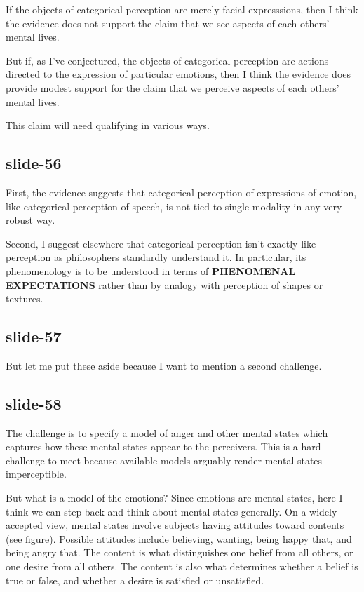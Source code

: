 \documentclass[12pt,\papersize]{extarticle}
\begin{document}
If the objects of categorical perception are merely facial expresssions,
then I think the evidence does not support the claim that we see aspects of
each others’ mental lives.

But if, as I’ve conjectured, the objects of categorical perception are
actions directed to the expression of particular emotions, then I think the
evidence does provide modest support for the claim that we perceive aspects
of each others’ mental lives.

This claim will need qualifying in various ways.

\subsection{slide-56}
First, the evidence suggests that categorical perception of expressions of emotion,
like categorical perception of speech, is not tied to single modality in any very
robust way.

Second, I suggest elsewhere that categorical perception isn’t exactly like
perception as philosophers standardly understand it.
In particular, its phenomenology is to be understood in terms of
\textbf{PHENOMENAL EXPECTATIONS} rather than by analogy with perception of shapes or textures.

\subsection{slide-57}
But let me put these aside because I want to mention a second challenge.

\subsection{slide-58}
The challenge is to specify a model of anger and other mental states which captures how these
mental states appear to the perceivers. This is a hard challenge to meet because available models
arguably render mental states imperceptible.

But what is a model of the emotions?
Since emotions are mental states, here I think we can step back and think about mental states generally.
On a widely accepted view, mental states involve subjects having  attitudes toward contents (see figure).
Possible attitudes include believing, wanting, being happy that, and being angry that.
The content is what distinguishes one belief from all others, or one desire from all others.
The content is also what determines whether a belief is true or false, and whether a desire is satisfied or unsatisfied.
\end{document}
